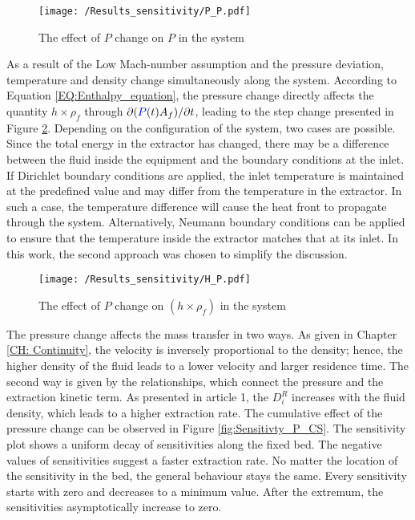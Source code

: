\documentclass[../Article_Model_Parameters.tex]{subfiles}
\begin{document}
    \begin{figure}[h!]
    	\centering
    	\texttt{[image: /Results\_sensitivity/P\_P.pdf]}
    	\caption{The effect of $P$ change on $P$ in the system}
    	\label{fig:Sensitivty_P_P}
    \end{figure}
    
	As a result of the Low Mach-number assumption and the pressure deviation, temperature and density change simultaneously along the system. According to Equation \ref{EQ:Enthalpy_equation}, the pressure change directly affects the quantity $h \times \rho_f$ through $\partial ({\color{blue}P}(t) A_f) / \partial t$, leading to the step change presented in Figure \ref{fig:Sensitivty_P_H}. Depending on the configuration of the system, two cases are possible. Since the total energy in the extractor has changed, there may be a difference between the fluid inside the equipment and the boundary conditions at the inlet. If Dirichlet boundary conditions are applied, the inlet temperature is maintained at the predefined value and may differ from the temperature in the extractor. In such a case, the temperature difference will cause the heat front to propagate through the system. Alternatively, Neumann boundary conditions can be applied to ensure that the temperature inside the extractor matches that at its inlet. In this work, the second approach was chosen to simplify the discussion.
    
    \begin{figure}[h!]
    	\centering
    	\texttt{[image: /Results\_sensitivity/H\_P.pdf]}
    	\caption{The effect of $P$ change on $(h \times \rho_f)$ in the system}
    	\label{fig:Sensitivty_P_H}
    \end{figure}

	The pressure change affects the mass transfer in two ways. As given in Chapter \ref{CH: Continuity}, the velocity is inversely proportional to the density; hence, the higher density of the fluid leads to a lower velocity and larger residence time. The second way is given by the relationships, which connect the pressure and the extraction kinetic term. As presented in {\color{red}article 1}, the $D_i^R$ increases with the fluid density, which leads to a higher extraction rate. The cumulative effect of the pressure change can be observed in Figure \ref{fig:Sensitivty_P_CS}. The sensitivity plot shows a uniform decay of sensitivities along the fixed bed. The negative values of sensitivities suggest a faster extraction rate. No matter the location of the sensitivity in the bed, the general behaviour stays the same. Every sensitivity starts with zero and decreases to a minimum value. After the extremum, the sensitivities asymptotically increase to zero.
\end{document}
